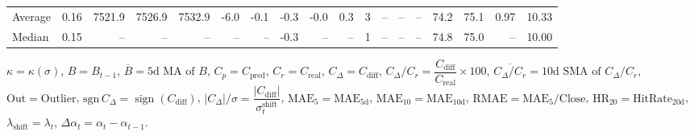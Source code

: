 \begin{threeparttable}
{\begin{tabular}{lrrrrrrrrrrrrrrrrr}
Average &     0.16 & 7521.9 & 7526.9 & 7532.9 &       -6.0 &           -0.1 &                      -0.3 &                     -0.0 &                 0.3 &              3 &         -- &        -- &             -- &             74.2 &                75.1 &            0.97 &                  10.33 \\
 Median &     0.15 &     -- &     -- &     -- &         -- &             -- &                      -0.3 &                       -- &                  -- &              1 &         -- &        -- &             -- &             74.8 &                75.0 &              -- &                  10.00 \\
\bottomrule
\end{tabular}
}
\begin{tablenotes}\footnotesize
\item $\kappa=\kappa(\sigma)$, $B=B_{t-1}$, $\overline{B}=\text{5d MA of }B$, $C_p=C_{\text{pred}}$, $C_r=C_{\text{real}}$, $C_\Delta=C_{\text{diff}}$, $C_\Delta/C_r=\dfrac{C_{\text{diff}}}{C_{\text{real}}}\times100$, $\overline{C_\Delta/C_r}=\text{10d SMA of }C_\Delta/C_r$, $\mathrm{Out}=\text{Outlier}$, $\mathrm{sgn}\,C_\Delta=\operatorname{sign}(C_{\text{diff}})$, $|C_\Delta|/\sigma=\dfrac{|C_{\text{diff}}|}{\sigma_t^{\text{shift}}}$, $\mathrm{MAE}_5=\mathrm{MAE}_{5\text{d}}$, $\mathrm{MAE}_{10}=\mathrm{MAE}_{10\text{d}}$, $\mathrm{RMAE}= \mathrm{MAE}_5 / \text{Close}$, $\mathrm{HR}_{20}=\mathrm{HitRate}_{20\text{d}}$, $\lambda_{\text{shift}}=\lambda_t$, $\Delta\alpha_t=\alpha_t-\alpha_{t-1}$.
\end{tablenotes}
\end{threeparttable}
\endgroup

